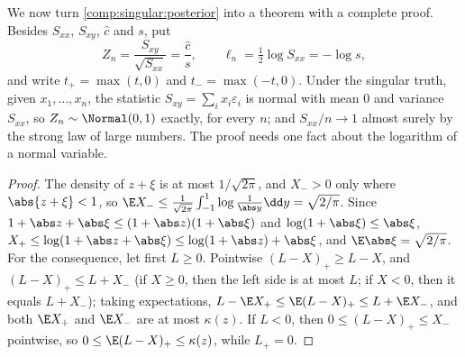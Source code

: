 \begin{refsection}
We now turn \cref{comp:singular:posterior} into a theorem with a complete proof. Besides $S_{xx}$, $S_{xy}$, $\hat c$ and $s$, put
\[
Z_n=\frac{S_{xy}}{\sqrt{S_{xx}}}=\frac{\hat c}s,\qquad\ell_n=\tfrac12\log S_{xx}=-\log s,
\]
and write $t_+=\max(t,0)$ and $t_-=\max(-t,0)$. Under the singular truth, given $x_1,\dots,x_n$, the statistic $S_{xy}=\sum_ix_i\varepsilon_i$ is normal with mean $0$ and variance $S_{xx}$, so $Z_n\sim\Normal(0,1)$ exactly, for every $n$; and $S_{xx}/n\to1$ almost surely by the strong law of large numbers. The proof needs one fact about the logarithm of a normal variable.


\begin{proof}
The density of $z+\xi$ is at most $1/\sqrt{2\pi}$, and $X_->0$ only where $\abs{z+\xi}<1$, so $\E X_-\le\frac1{\sqrt{2\pi}}\int_{-1}^1\log\frac1{\abs y}\dd y=\sqrt{2/\pi}$. Since $1+\abs z+\abs\xi\le(1+\abs z)(1+\abs\xi)$ and $\log(1+\abs\xi)\le\abs\xi$, $X_+\le\log(1+\abs z+\abs\xi)\le\log(1+\abs z)+\abs\xi$, and $\E\abs\xi=\sqrt{2/\pi}$. For the consequence, let first $L\ge0$. Pointwise $(L-X)_+\ge L-X$, and $(L-X)_+\le L+X_-$ (if $X\ge0$, then the left side is at most $L$; if $X<0$, then it equals $L+X_-$); taking expectations, $L-\E X_+\le\E(L-X)_+\le L+\E X_-$, and both $\E X_+$ and $\E X_-$ are at most $\kappa(z)$. If $L<0$, then $0\le(L-X)_+\le X_-$ pointwise, so $0\le\E(L-X)_+\le\kappa(z)$, while $L_+=0$.
\end{proof}


\end{refsection}
